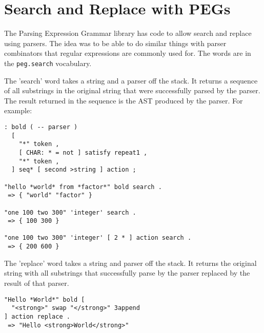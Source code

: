 \chapter{Search and Replace with PEGs}\label{seachreplace}

The Parsing Expression Grammar library has code to allow search and replace using parsers. The idea was to be able to do similar things with parser combinators that regular expressions are commonly used for. The words are in the \texttt{peg.search} vocabulary.


The 'search' word takes a string and a parser off the stack. It returns a sequence of all substrings in the original string that were successfully parsed by the parser. The result returned in the sequence is the AST produced by the parser. For example:

\begin{verbatim}
: bold ( -- parser )
  [
    "*" token ,
    [ CHAR: * = not ] satisfy repeat1 ,
    "*" token ,
  ] seq* [ second >string ] action ;

"hello *world* from *factor*" bold search . 
 => { "world" "factor" } 

"one 100 two 300" 'integer' search .
 => { 100 300 }

"one 100 two 300" 'integer' [ 2 * ] action search .
 => { 200 600 }
\end{verbatim}


The 'replace' word takes a string and parser off the stack. It returns the original string with all substrings that successfully parse by the parser replaced by the result of that parser.

\begin{verbatim}
"Hello *World*" bold [ 
  "<strong>" swap "</strong>" 3append 
] action replace .
 => "Hello <strong>World</strong>"
\end{verbatim}


